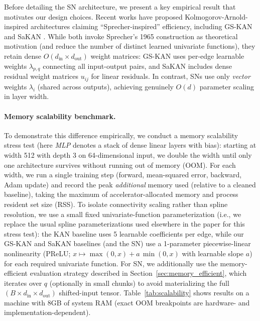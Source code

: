 \documentclass{article}
\theoremstyle{plain}
\theoremstyle{definition}
\theoremstyle{remark}
\begin{document}
Before detailing the SN architecture, we present a key empirical result that motivates our design choices. Recent works have proposed Kolmogorov-Arnold-inspired architectures claiming ``Sprecher-inspired'' efficiency, including GS-KAN \cite{eliasson2025gskan} and SaKAN \cite{sakan2025}. While both invoke Sprecher's 1965 construction as theoretical motivation (and reduce the number of distinct learned univariate functions), they retain dense $O(d_{\mathrm{in}} \times d_{\mathrm{out}})$ weight matrices: GS-KAN uses per-edge learnable weights $\lambda_{p,q}$ connecting all input-output pairs, and SaKAN includes dense residual weight matrices $u_{ij}$ for linear residuals. In contrast, SNs use only \emph{vector} weights $\lambda_i$ (shared across outputs), achieving genuinely $O(d)$ parameter scaling in layer width.

\paragraph{Memory scalability benchmark.}
To demonstrate this difference empirically, we conduct a memory scalability stress test (here \emph{MLP} denotes a stack of dense linear layers with bias): starting at width 512 with depth 3 on 64-dimensional input, we double the width until only one architecture survives without running out of memory (OOM). For each width, we run a single training step (forward, mean-squared error, backward, Adam update) and record the peak \emph{additional} memory used (relative to a cleaned baseline), taking the maximum of accelerator-allocated memory and process resident set size (RSS). To isolate connectivity scaling rather than spline resolution, we use a small fixed univariate-function parameterization (i.e., we replace the usual spline parameterizations used elsewhere in the paper for this stress test): the KAN baseline uses 5 learnable coefficients per edge, while our GS-KAN and SaKAN baselines (and the SN) use a 1-parameter piecewise-linear nonlinearity (PReLU; $x\mapsto \max(0,x) + a\,\min(0,x)$ with learnable slope $a$) for each required univariate function. For SN, we additionally use the memory-efficient evaluation strategy described in Section~\ref{sec:memory_efficient}, which iterates over $q$ (optionally in small chunks) to avoid materializing the full $(B\times d_{\mathrm{in}}\times d_{\mathrm{out}})$ shifted-input tensor. Table~\ref{tab:scalability} shows results on a machine with 8GB of system RAM (exact OOM breakpoints are hardware- and implementation-dependent).
\end{document}
